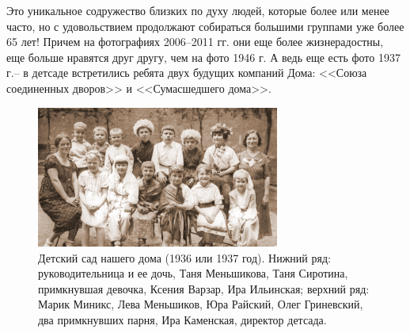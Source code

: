 Это уникальное содружество близких по духу людей, которые более или менее часто, но с удовольствием продолжают собираться большими группами уже более 65 лет! Причем на фотографиях 2006--2011 гг. они еще более жизнерадостны, еще больше нравятся друг другу, чем на фото 1946 г. А ведь еще есть фото 1937 г.-- в детсаде встретились ребята двух будущих компаний Дома: <<Союза соединенных дворов>> и <<Сумасшедшего дома>>.

\newpage


\singlespacing

\thispagestyle{empty} 
\begin{figure}
    \includegraphics[width=80mm]{inc/15/1}
    \caption{Детский сад нашего дома (1936 или 1937 год). Нижний ряд: руководительница и ее дочь, Таня Меньшикова, Таня Сиротина, примкнувшая девочка, Ксения Варзар, Ира Ильинская; верхний ряд: Марик Миникс, Лева Меньшиков, Юра Райский, Олег Гриневский, два примкнувших парня, Ира Каменская, директор детсада.
}
\end{figure}

